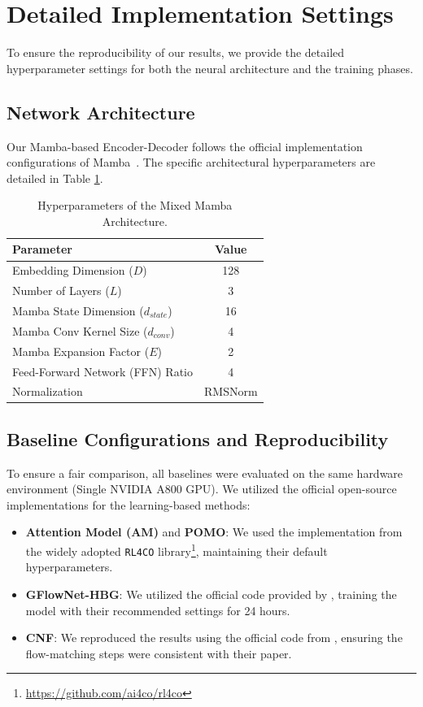 \documentclass{article}
\theoremstyle{plain}
\theoremstyle{definition}
\theoremstyle{remark}
\begin{document}
\section{Detailed Implementation Settings}

To ensure the reproducibility of our results, we provide the detailed hyperparameter settings for both the neural architecture and the training phases.


\subsection{Network Architecture}
Our Mamba-based Encoder-Decoder follows the official implementation configurations of Mamba~\cite{mamba}. The specific architectural hyperparameters are detailed in Table \ref{tab:arch_params}.

\begin{table}[h]
\caption{Hyperparameters of the Mixed Mamba Architecture.}
\label{tab:arch_params}
\centering  %
\begin{sc}
\begin{tabular}{p{8cm}c}  %
\toprule
Parameter & Value \\
\midrule
Embedding Dimension ($D$) & 128 \\
Number of Layers ($L$) & 3 \\
Mamba State Dimension ($d_{state}$) & 16 \\
Mamba Conv Kernel Size ($d_{conv}$) & 4 \\
Mamba Expansion Factor ($E$) & 2 \\
Feed-Forward Network (FFN) Ratio & 4 \\
Normalization & RMSNorm \\
\bottomrule
\end{tabular}
\end{sc}
\end{table}

\subsection{Baseline Configurations and Reproducibility}

To ensure a fair comparison, all baselines were evaluated on the same hardware environment (Single NVIDIA A800 GPU). We utilized the official open-source implementations for the learning-based methods: 

\begin{itemize}
    \item \textbf{Attention Model (AM)} and \textbf{POMO}: We used the implementation from the widely adopted \texttt{RL4CO} library\footnote{\url{https://github.com/ai4co/rl4co}}, maintaining their default hyperparameters.
    \item \textbf{GFlowNet-HBG}: We utilized the official code provided by \cite{GFlowNet}, training the model with their recommended settings for 24 hours.
    \item \textbf{CNF}: We reproduced the results using the official code from \cite{CNF}, ensuring the flow-matching steps were consistent with their paper.
\end{itemize}
\end{document}
